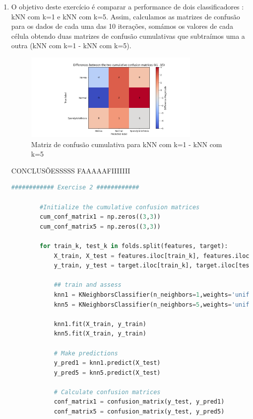 \documentclass[a4paper,12pt]{article} %
\begin{document}
\begin{enumerate}
    \item O objetivo deste exercício é comparar a performance de dois classificadores : kNN com k=1 e kNN com k=5. 
    Assim, calculamos as matrizes de confusão para os dados de cada uma das 10 iterações, somámos os valores de cada célula obtendo duas matrizes de confusão cumulativas que subtraímos uma a outra (kNN com k=1 - kNN com k=5).
    \begin{figure}[H]
        \centering
        \includegraphics[width=0.8\textwidth]{ex2_cummatrix.png}
        \caption{Matriz de confusão cumulativa para kNN com k=1 - kNN com k=5}
        \label{fig:ex2a}
    \end{figure}

    CONCLUSÕESSSSS FAAAAAFIIIIIII

    \begin{lstlisting}[language=Python]
        ############ Exercise 2 ############

        #Initialize the cumulative confusion matrices
        cum_conf_matrix1 = np.zeros((3,3))
        cum_conf_matrix5 = np.zeros((3,3))
        
        for train_k, test_k in folds.split(features, target):
            X_train, X_test = features.iloc[train_k], features.iloc[test_k]
            y_train, y_test = target.iloc[train_k], target.iloc[test_k]
            
            ## train and assess
            knn1 = KNeighborsClassifier(n_neighbors=1,weights='uniform',metric='euclidean')
            knn5 = KNeighborsClassifier(n_neighbors=5,weights='uniform',metric='euclidean')
        
            knn1.fit(X_train, y_train)
            knn5.fit(X_train, y_train)
        
            # Make predictions
            y_pred1 = knn1.predict(X_test)
            y_pred5 = knn5.predict(X_test)
        
            # Calculate confusion matrices
            conf_matrix1 = confusion_matrix(y_test, y_pred1)
            conf_matrix5 = confusion_matrix(y_test, y_pred5)
        

\end{lstlisting}
\end{enumerate}
\end{document}
